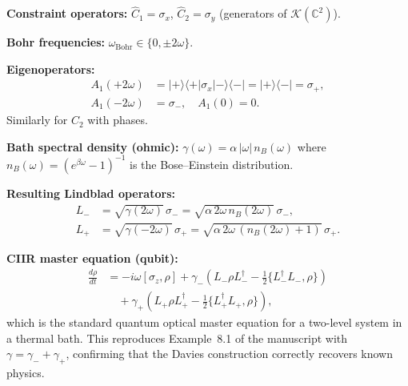 \textbf{Constraint operators:}
$\hat{C}_1 = \sigma_x$, $\hat{C}_2 = \sigma_y$ (generators of
$\mathcal{K}(\mathbb{C}^2)$).

\textbf{Bohr frequencies:}  $\omega_{\mathrm{Bohr}} \in \{0, \pm 2\omega\}$.

\textbf{Eigenoperators:}
\begin{align}
  A_1(+2\omega) &= |+\rangle\langle +| \sigma_x |-\rangle\langle -|
    = |+\rangle\langle -| = \sigma_+, \\
  A_1(-2\omega) &= \sigma_-, \quad
  A_1(0) = 0.
\end{align}
Similarly for $\hat{C}_2$ with phases.

\textbf{Bath spectral density (ohmic):}
$\gamma(\omega) = \alpha\, |\omega|\, n_B(\omega)$ where
$n_B(\omega) = (e^{\beta\omega} - 1)^{-1}$ is the Bose--Einstein
distribution.

\textbf{Resulting Lindblad operators:}
\begin{align}
  L_- &= \sqrt{\gamma(2\omega)}\, \sigma_- = \sqrt{\alpha\, 2\omega\, n_B(2\omega)}\, \sigma_-, \\
  L_+ &= \sqrt{\gamma(-2\omega)}\, \sigma_+ = \sqrt{\alpha\, 2\omega\, (n_B(2\omega)+1)}\, \sigma_+.
\end{align}

\textbf{CIIR master equation (qubit):}
\begin{align}
  \frac{d\rho}{dt} &= -i\omega[\sigma_z, \rho]
    + \gamma_-(L_-\rho L_-^\dagger - \tfrac{1}{2}\{L_-^\dagger L_-, \rho\})
    \nonumber\\
    &\quad + \gamma_+(L_+\rho L_+^\dagger - \tfrac{1}{2}\{L_+^\dagger L_+, \rho\}),
  \label{eq:c9:qubit_master}
\end{align}
which is the standard quantum optical master equation for a
two-level system in a thermal bath.  This reproduces Example~8.1 of the
manuscript with $\gamma = \gamma_- + \gamma_+$, confirming that the
Davies construction correctly recovers known physics.


\endinput
